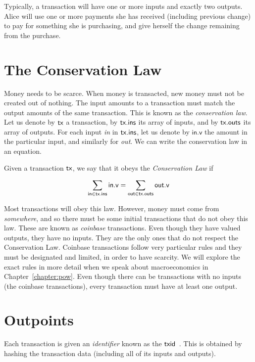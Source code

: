 Typically, a transaction will have one or more inputs and exactly two outputs. Alice will use
one or more payments she has received (including previous change) to pay for something she is
purchasing, and give herself the change remaining from the purchase.

\section{The Conservation Law}

Money needs to be scarce. When money is transacted, new money must not be created out of nothing.
The input amounts to a transaction must
match the output amounts of the same transaction. This is known as the \emph{conservation law}.
Let us denote by $\mathsf{tx}$ a transaction, by $\mathsf{tx}\textsf{.ins}$ its array of inputs,
and by $\mathsf{tx}\textsf{.outs}$ its array of outputs. For each input \emph{in} in
$\mathsf{tx}\textsf{.ins}$, let us denote by $\textsf{in.v}$ the amount in the particular
input, and similarly for \emph{out}. We can write the conservation law in an equation.

\begin{definition}
  Given a transaction $\mathsf{tx}$, we say that it obeys the \emph{Conservation Law} if

  \[
    \sum_{\textsf{in} \in \mathsf{tx}\textsf{.ins}} \textsf{in.v} = \sum_{\textsf{out} \in \mathsf{tx}\textsf{.outs}} \textsf{out.v}
  \]
\end{definition}

Most transactions will obey this law. However, money must come from \emph{somewhere},
and so there must be some initial transactions that do not obey this law. These are known as
\emph{coinbase} transactions. Even though they have valued outputs, they have no inputs. They
are the only ones that do not respect the Conservation Law.
Coinbase transactions follow very particular rules and they must be designated and limited,
in order to have scarcity.
We will explore the exact rules
in more detail when we speak about macroeconomics in Chapter~\ref{chapter:pow}.
Even though there can be transactions with no inputs (the coinbase transactions), every
transaction must have at least one output.

\section{Outpoints}

Each transaction is given an \emph{identifier} known as the \emph{$\mathsf{txid}$}~. This is
obtained by hashing the transaction data (including all of its inputs and outputs).

